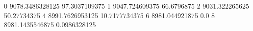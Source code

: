 0 9078.3486328125 97.3037109375
1 9047.724609375 66.6796875
2 9031.322265625 50.27734375
4 8991.7626953125 10.7177734375
6 8981.044921875 0.0
8 8981.1435546875 0.0986328125
